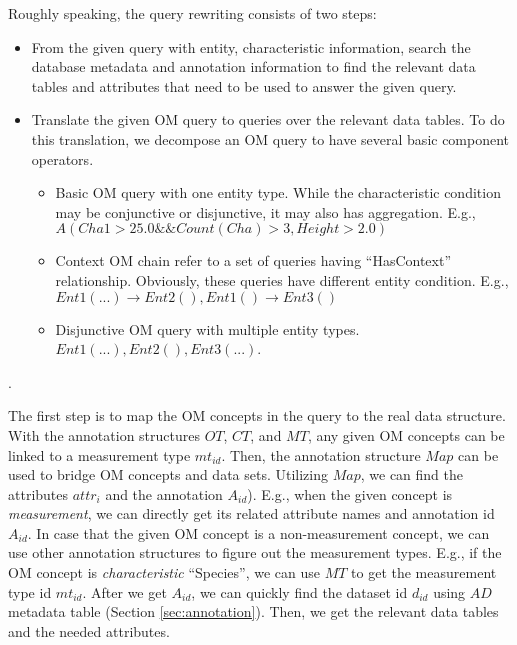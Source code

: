 Roughly speaking, the query rewriting consists of two steps:
\begin{itemize}
\item From the given query with entity, characteristic information, search the database metadata and
  annotation information to find the relevant data tables and
  attributes that need to be used to answer the given query.
\item Translate the given OM query to queries over the relevant data
  tables. To do this translation, we decompose an OM query to have several basic component operators.
  \begin{itemize}
  \item Basic OM query with one entity type. While the characteristic condition may be conjunctive or disjunctive, it may also has aggregation. E.g., $A(Cha1>25.0 \&\& Count(Cha)>3, Height>2.0)$
  \item Context OM chain refer to a set of queries having ``HasContext'' relationship. Obviously, these queries have different entity condition. E.g., $Ent1(...) \rightarrow Ent2(), Ent1() \rightarrow Ent3()$
  \item Disjunctive OM query with multiple entity types. $Ent1(...), Ent2(), Ent3(...)$.
  \end{itemize}


\end{itemize}

.

The first step is to map the OM concepts in the query to the real data
structure.
With the annotation structures $OT$, $CT$, and $MT$, any given OM
concepts can be linked to a measurement type $mt_{id}$.
Then, the annotation structure $Map$ can be used to bridge OM concepts and data sets.
Utilizing $Map$, we can find the attributes $attr_i$ and the
annotation $A_{id}$).
E.g., when the given concept is {\em measurement}, we can directly get
its related attribute names and annotation id $A_{id}$.
In case that the given OM concept is a non-measurement concept, we can use
other annotation structures to figure out the measurement types.
E.g., if the OM concept is {\em characteristic} ``Species'', we can use
$MT$ to get the measurement type id $mt_{id}$.
After we get $A_{id}$, we can quickly find the dataset id $d_{id}$
using $AD$ metadata table (Section \ref{sec:annotation}).
Then, we get the relevant data tables and the needed attributes.

